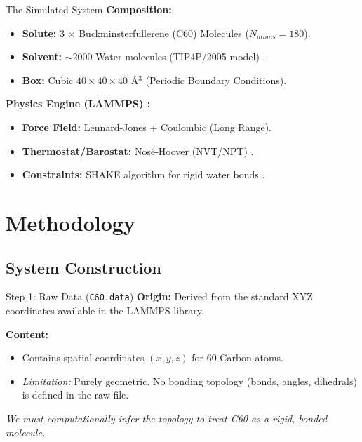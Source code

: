 \documentclass[aspectratio=169, 10pt]{beamer}
\begin{document}
\begin{frame}{The Simulated System}
    \textbf{Composition:}
    \begin{itemize}
        \item \textbf{Solute:} 3 $\times$ Buckminsterfullerene (C60) Molecules ($N_{atoms} = 180$).
        \item \textbf{Solvent:} $\sim$2000 Water molecules (TIP4P/2005 model) .
        \item \textbf{Box:} Cubic $40 \times 40 \times 40$ \AA$^3$ (Periodic Boundary Conditions).
    \end{itemize}

    \vspace{0.5cm}
    \textbf{Physics Engine (LAMMPS) :}
    \begin{itemize}
        \item \textbf{Force Field:} Lennard-Jones + Coulombic (Long Range).
        \item \textbf{Thermostat/Barostat:} Nosé-Hoover (NVT/NPT) .
        \item \textbf{Constraints:} SHAKE algorithm for rigid water bonds .
    \end{itemize}
\end{frame}

\section{Methodology}
\subsection{System Construction}

\begin{frame}{Step 1: Raw Data (\texttt{C60.data})}
    \textbf{Origin:} 
    Derived from the standard XYZ coordinates available in the LAMMPS library.
    
    \vspace{0.5cm}
    \textbf{Content:}
    \begin{itemize}
        \item Contains spatial coordinates $(x, y, z)$ for 60 Carbon atoms.
        \item \textit{Limitation:} Purely geometric. No bonding topology (bonds, angles, dihedrals) is defined in the raw file.
    \end{itemize}
    
    \vspace{0.5cm}
    \textit{We must computationally infer the topology to treat C60 as a rigid, bonded molecule.}
\end{frame}
\end{document}
